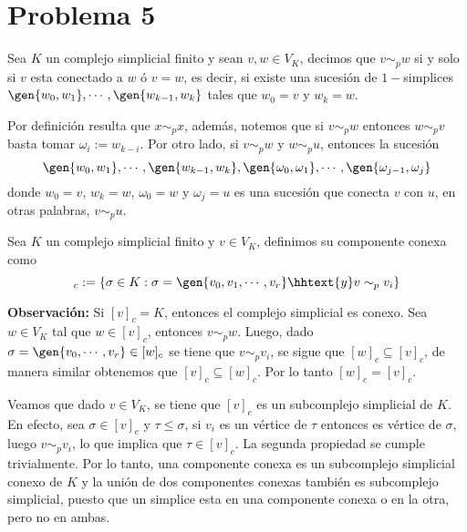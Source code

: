 \documentclass{article}
\begin{document}
\section*{Problema 5}
\noindent Sea $K$ un complejo simplicial finito y sean $v,w\in V_{K}$, decimos que $v\sim_{p}w$ si
y solo si $v$ esta conectado a $w$ ó $v=w$, es decir, si existe una sucesión de $1-$simplices
$\gen{w_{0},w_{1}},\cdots,\gen{w_{k-1},w_{k}}$ tales que $w_{0}=v$ y $w_{k}=w$.

\vspace{1mm}
\noindent Por definición resulta que $x\sim_{p}x$, además, notemos que si $v\sim_{p}w$ entonces 
$w\sim_{p}v$ basta tomar $\omega_{i}:=w_{k-i}$. Por otro lado, si $v\sim_{p}w$ y $w\sim_{p}u$, 
entonces la sucesión
\begin{equation*}
    \gen{w_{0},w_{1}},\cdots,\gen{w_{k-1},w_{k}},\gen{\omega_{0},\omega_{1}},\cdots,
    \gen{\omega_{j-1},\omega_{j}}
\end{equation*}
donde $w_{0}=v$, $w_{k}=w$, $\omega_{0}=w$ y $\omega_{j}=u$ es una sucesión que conecta $v$ con 
$u$, en otras palabras, $v\sim_{p}u$.

\vspace{2mm}
\begin{dfn}
    Sea $K$ un complejo simplicial finito y $v\in V_{K}$, definimos su componente conexa
    como
    \begin{equation*}
        [v]_{c}:=\{\sigma\in K:\sigma=\gen{v_{0},v_{1},\cdots,v_{r}}\hhtext{y}v\sim_{p}v_{i}\}
    \end{equation*}
\end{dfn}

\noindent\textbf{Observación:} Si $[v]_{c}=K$, entonces el complejo simplicial es conexo. Sea 
$w\in V_{K}$ tal que $w\in[v]_{c}$, entonces $v\sim_{p}w$. Luego, dado $\sigma
=\gen{v_{0},\cdots,v_{r}}\in[w]_{c}$ se tiene que $v\sim_{p}v_{i}$, se sigue que 
$[w]_{c}\subseteq[v]_{c}$, de manera similar obtenemos que $[v]_{c}\subseteq[w]_{c}$. Por lo tanto
$[w]_{c}=[v]_{c}$.

\vspace{1mm}
\noindent Veamos que dado $v\in V_{K}$, se tiene que $[v]_{c}$ es un subcomplejo simplicial de 
$K$. En efecto, sea $\sigma\in[v]_{c}$ y $\tau\leq\sigma$, si $v_{i}$ es un vértice de $\tau$ 
entonces es vértice de $\sigma$, luego $v\sim_{p}v_{i}$, lo que implica que $\tau\in[v]_{c}$. La
segunda propiedad se cumple trivialmente. Por lo tanto, una componente conexa es un subcomplejo 
simplicial conexo de $K$ y la unión de dos componentes conexas también es subcomplejo simplicial, 
puesto que un simplice esta en una componente conexa o en la otra, pero no en ambas.
\end{document}
